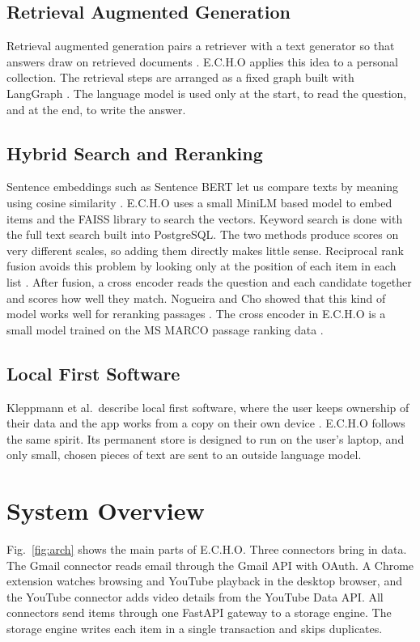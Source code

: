 \documentclass[conference]{IEEEtran}
\begin{document}
\subsection{Retrieval Augmented Generation}
Retrieval augmented generation pairs a retriever with a text generator so that answers draw on retrieved documents \cite{b4}. E.C.H.O applies this idea to a personal collection. The retrieval steps are arranged as a fixed graph built with LangGraph \cite{b5}. The language model is used only at the start, to read the question, and at the end, to write the answer.

\subsection{Hybrid Search and Reranking}
Sentence embeddings such as Sentence BERT let us compare texts by meaning using cosine similarity \cite{b6}. E.C.H.O uses a small MiniLM based model \cite{b7} to embed items and the FAISS library \cite{b8} to search the vectors. Keyword search is done with the full text search built into PostgreSQL. The two methods produce scores on very different scales, so adding them directly makes little sense. Reciprocal rank fusion avoids this problem by looking only at the position of each item in each list \cite{b9}. After fusion, a cross encoder reads the question and each candidate together and scores how well they match. Nogueira and Cho showed that this kind of model works well for reranking passages \cite{b10}. The cross encoder in E.C.H.O is a small model trained on the MS MARCO passage ranking data \cite{b11}.

\subsection{Local First Software}
Kleppmann et al.\ describe local first software, where the user keeps ownership of their data and the app works from a copy on their own device \cite{b12}. E.C.H.O follows the same spirit. Its permanent store is designed to run on the user's laptop, and only small, chosen pieces of text are sent to an outside language model.

\section{System Overview}\label{sec:overview}
Fig.~\ref{fig:arch} shows the main parts of E.C.H.O. Three connectors bring in data. The Gmail connector reads email through the Gmail API with OAuth. A Chrome extension watches browsing and YouTube playback in the desktop browser, and the YouTube connector adds video details from the YouTube Data API. All connectors send items through one FastAPI gateway to a storage engine. The storage engine writes each item in a single transaction and skips duplicates.
\end{document}
